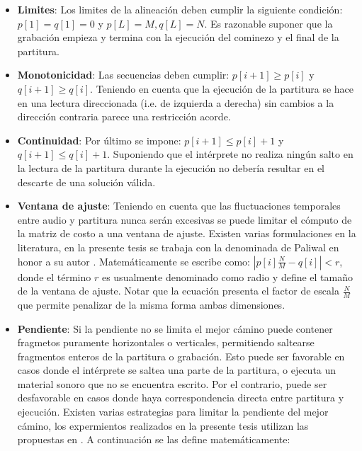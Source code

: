 \documentclass
  [ams,pdfout]%
	{aeslac}
\begin{document}
\begin{itemize}
\item \textbf{Limites}: Los limites de la alineación deben cumplir la siguiente condición: $p[1] = q [1] = 0$ y $p[L] = M, q[L] = N$. Es razonable suponer que la grabación empieza y termina con la ejecución del cominezo y el final de la partitura.
\item \textbf{Monotonicidad}: Las secuencias deben cumplir: $p[i+1] \geq p[i]$ y $q[i+1] \geq q[i]$. Teniendo en cuenta que la ejecución de la partitura se hace en una lectura direccionada (i.e. de izquierda a derecha) sin cambios a la dirección contraria parece una restricción acorde. 
\item \textbf{Continuidad}: Por último se impone: $p[i+1] \leq p[i] + 1$ y $q[i+1] \leq q[i] + 1$.  Suponiendo que el intérprete no realiza ningún salto en la lectura de la partitura durante la ejecución no debería resultar en el descarte de una solución válida. 
\item \textbf{Ventana de ajuste}: Teniendo en cuenta que las fluctuaciones temporales entre audio y partitura nunca serán excesivas se puede limitar el cómputo de la matriz de costo a una ventana de ajuste. Existen varias formulaciones en la literatura, en la presente tesis se trabaja con la denominada de Paliwal en honor a su autor \cite{paliwal1982modification}. Matemáticamente se escribe como: $|p[i]\frac{N}{M}-q[i]|<r$, donde el término $r$ es usualmente denominado como radio y define el tamaño de la ventana de ajuste. Notar que la ecuación presenta el factor de escala $\frac{N}{M}$ que permite penalizar de la misma forma ambas dimensiones. 
\item \textbf{Pendiente}: Si la pendiente no se limita el mejor cámino puede contener fragmetos puramente horizontales o verticales, permitiendo saltearse fragmentos enteros de la partitura o grabación. Esto puede ser favorable en casos donde el intérprete se saltea una parte de la partitura, o ejecuta un material sonoro que no se encuentra escrito. Por el contrario, puede ser desfavorable en casos donde haya correspondencia directa entre partitura y ejecución. Existen varias estrategias para limitar la pendiente del mejor cámino, los expermientos realizados en la presente tesis utilizan las propuestas en \cite{sakoe1978dynamic}. A continuación se las define matemáticamente: 




\end{itemize}
\end{document}
